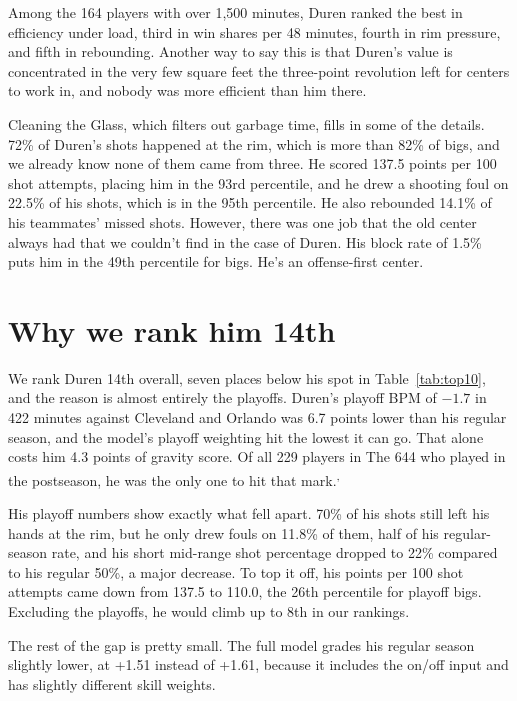 \documentclass[11pt]{article}
\begin{document}
Among the 164 players with over 1,500 minutes, Duren ranked the best in efficiency under
load, third in win shares per 48 minutes, fourth in rim pressure, and fifth in rebounding.
Another way to say this is that Duren's value is concentrated in the very few square feet the
three-point revolution left for centers to work in, and nobody was more efficient than him
there.

Cleaning the Glass, which filters out garbage time, fills in some of the details. 72\% of
Duren's shots happened at the rim, which is more than 82\% of bigs, and we already know none
of them came from three. He scored 137.5 points per 100 shot attempts, placing him in the 93rd
percentile, and he drew a shooting foul on 22.5\% of his shots, which is in the 95th
percentile. He also rebounded 14.1\% of his teammates' missed shots. However, there was one
job that the old center always had that we couldn't find in the case of Duren. His block rate
of 1.5\% puts him in the 49th percentile for
bigs. He's an offense-first center.

\section*{Why we rank him 14th}

We rank Duren 14th overall, seven places below his spot in Table~\ref{tab:top10}, and the
reason is almost entirely the playoffs. Duren's playoff BPM of $-1.7$ in 422 minutes against
Cleveland and Orlando was 6.7 points lower than his regular season, and the model's playoff
weighting hit the lowest it can go. That alone costs him 4.3 points of gravity score. Of all
229 players in The 644 who played in the postseason, he was the only one to hit that
mark.\textsuperscript{,}

His playoff numbers show exactly what fell apart. 70\% of his shots still left his hands at
the rim, but he only drew fouls on 11.8\% of them, half of his regular-season rate, and his
short mid-range shot percentage dropped to 22\% compared to his regular 50\%, a major
decrease. To top it off, his points per 100 shot attempts came down from 137.5 to 110.0, the
26th percentile for playoff bigs.
Excluding the playoffs, he would climb up to 8th in our rankings.

The rest of the gap is pretty small. The full model grades his regular season slightly lower,
at +1.51 instead of +1.61, because it includes the on/off input and has slightly different
skill weights.
\end{document}

